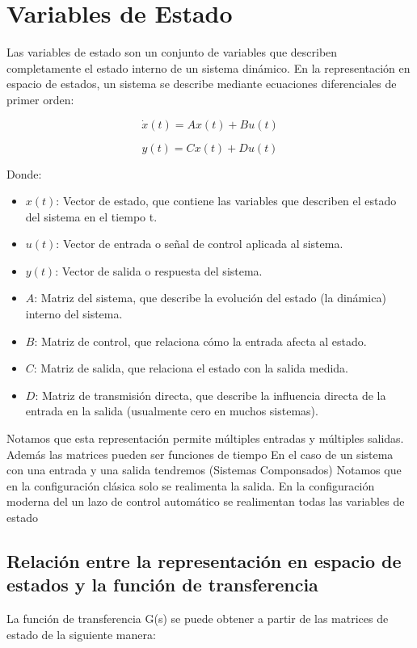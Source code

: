 \documentclass[legalpaper,twocolumn]{article}
\begin{document}
\section*{Variables de Estado}

Las variables de estado son un conjunto de variables que describen completamente el estado interno de un sistema dinámico. En la representación en espacio de estados, un sistema se describe mediante ecuaciones diferenciales de primer orden:

\[\dot{x}(t) = A x(t) + B u(t)\]

\[y(t) = C x(t) + D u(t)\]

Donde:

\begin{itemize}
    \item \(x(t)\): Vector de estado, que contiene las variables que describen el estado del sistema en el tiempo t.
    \item \(u(t)\): Vector de entrada o señal de control aplicada al sistema.
    \item \(y(t)\): Vector de salida o respuesta del sistema.
    \item \(A\): Matriz del sistema, que describe la evolución del estado (la dinámica) interno del sistema.
    \item \(B\): Matriz de control, que relaciona cómo la entrada afecta al estado.
    \item \(C\): Matriz de salida, que relaciona el estado con la salida medida.
    \item \(D\): Matriz de transmisión directa, que describe la influencia directa de la entrada en la salida (usualmente cero en muchos sistemas).
\end{itemize}

Notamos que esta representación permite múltiples entradas y múltiples salidas. Además las matrices pueden ser funciones de tiempo
En el caso de un sistema con una entrada y una salida tendremos (Sistemas Componsados)
Notamos que en la configuración clásica solo se realimenta la salida.
En la configuración moderna del un lazo de control automático se realimentan todas las
variables de estado

\subsection*{Relación entre la representación en espacio de estados y la función de transferencia}

La función de transferencia G(s) se puede obtener a partir de las matrices de estado de la siguiente manera:
\end{document}
